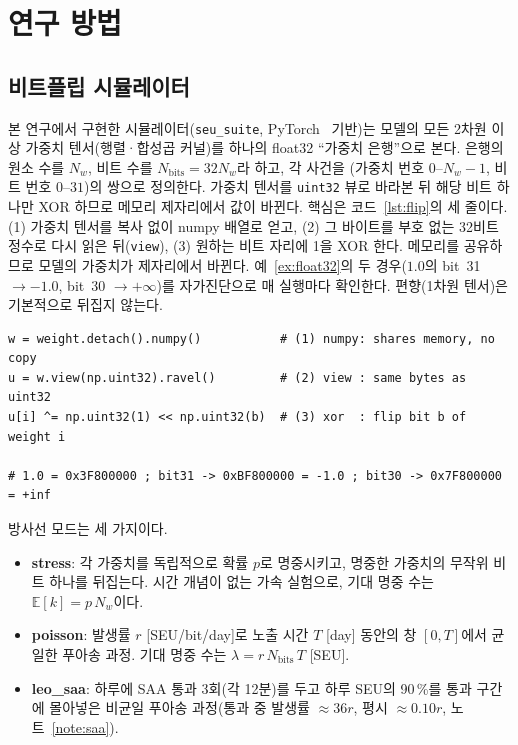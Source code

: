 \documentclass[11pt,a4paper]{article}
\newcommand{\code}[1]{\texttt{#1}}
\newcounter{note}
\begin{document}
\section{연구 방법}

\subsection{비트플립 시뮬레이터}
본 연구에서 구현한 시뮬레이터(\code{seu\_suite}, PyTorch~\citep{paszke2019} 기반)는 모델의 모든 2차원 이상 가중치 텐서(행렬·합성곱 커널)를 하나의 float32 ``가중치 은행''으로 본다. 은행의 원소 수를 $N_w$, 비트 수를 $N_{\mathrm{bits}}=32N_w$라 하고, 각 사건을 (가중치 번호 $0$--$N_w{-}1$, 비트 번호 $0$--$31$)의 쌍으로 정의한다. 가중치 텐서를 \code{uint32} 뷰로 바라본 뒤 해당 비트 하나만 XOR 하므로 메모리 제자리에서 값이 바뀐다. 핵심은 코드~\ref{lst:flip}의 세 줄이다. (1) 가중치 텐서를 복사 없이 numpy 배열로 얻고, (2) 그 바이트를 부호 없는 32비트 정수로 다시 읽은 뒤(\code{view}), (3) 원하는 비트 자리에 1을 XOR 한다. 메모리를 공유하므로 모델의 가중치가 제자리에서 바뀐다. 예~\ref{ex:float32}의 두 경우($1.0$의 bit~31 $\to -1.0$, bit~30 $\to +\infty$)를 자가진단으로 매 실행마다 확인한다. 편향(1차원 텐서)은 기본적으로 뒤집지 않는다.

\begin{lstlisting}[float=htb,caption={비트플립의 핵심: numpy $\to$ view $\to$ XOR 세 단계.},label={lst:flip}]
w = weight.detach().numpy()           # (1) numpy: shares memory, no copy
u = w.view(np.uint32).ravel()         # (2) view : same bytes as uint32
u[i] ^= np.uint32(1) << np.uint32(b)  # (3) xor  : flip bit b of weight i

# 1.0 = 0x3F800000 ; bit31 -> 0xBF800000 = -1.0 ; bit30 -> 0x7F800000 = +inf
\end{lstlisting}

방사선 모드는 세 가지이다.
\begin{itemize}[leftmargin=*]
  \item \textbf{stress}: 각 가중치를 독립적으로 확률 $p$로 명중시키고, 명중한 가중치의 무작위 비트 하나를 뒤집는다. 시간 개념이 없는 가속 실험으로, 기대 명중 수는 $\mathbb{E}[k]=p\,N_w$이다.
  \item \textbf{poisson}: 발생률 $r$ [SEU/bit/day]로 노출 시간 $T$ [day] 동안의 창 $[0,T]$에서 균일한 푸아송 과정. 기대 명중 수는 $\lambda = r\,N_{\mathrm{bits}}\,T$ [SEU].
  \item \textbf{leo\_saa}: 하루에 SAA 통과 3회(각 12분)를 두고 하루 SEU의 90\,\%를 통과 구간에 몰아넣은 비균일 푸아송 과정(통과 중 발생률 $\approx36r$, 평시 $\approx0.10r$, 노트~\ref{note:saa}).
\end{itemize}
\end{document}
